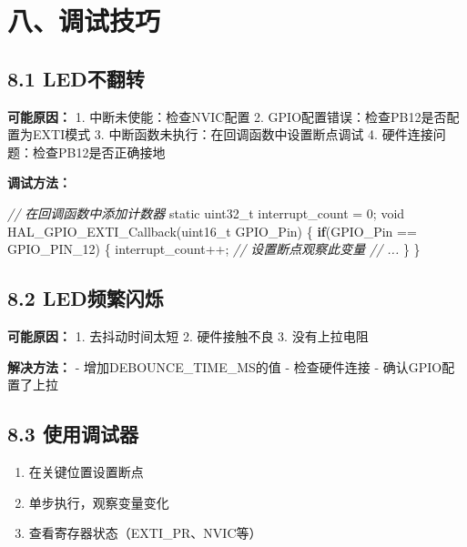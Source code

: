 \documentclass[
  chinese,
  UTF8,
  oneside,
  openany]{ctexbook}
\newenvironment{Shaded}{}{}
\newcommand{\CommentTok}[1]{\textcolor[rgb]{0.38,0.63,0.69}{\textit{#1}}}
\newcommand{\ControlFlowTok}[1]{\textcolor[rgb]{0.00,0.44,0.13}{\textbf{#1}}}
\newcommand{\DataTypeTok}[1]{\textcolor[rgb]{0.56,0.13,0.00}{#1}}
\newcommand{\DecValTok}[1]{\textcolor[rgb]{0.25,0.63,0.44}{#1}}
\newcommand{\NormalTok}[1]{#1}
\newcommand{\OperatorTok}[1]{\textcolor[rgb]{0.40,0.40,0.40}{#1}}
\providecommand{\tightlist}{%
  \setlength{\itemsep}{0pt}\setlength{\parskip}{0pt}}
\begin{document}
\section{八、调试技巧}\label{ux516bux8c03ux8bd5ux6280ux5de7}

\subsection{8.1 LED不翻转}\label{ledux4e0dux7ffbux8f6c}

\textbf{可能原因：} 1. 中断未使能：检查NVIC配置 2.
GPIO配置错误：检查PB12是否配置为EXTI模式 3.
中断函数未执行：在回调函数中设置断点调试 4.
硬件连接问题：检查PB12是否正确接地

\textbf{调试方法：}

\begin{Shaded}
\begin{Highlighting}[]
\CommentTok{// 在回调函数中添加计数器}
\DataTypeTok{static} \DataTypeTok{uint32\_t}\NormalTok{ interrupt\_count }\OperatorTok{=} \DecValTok{0}\OperatorTok{;}
\DataTypeTok{void}\NormalTok{ HAL\_GPIO\_EXTI\_Callback}\OperatorTok{(}\DataTypeTok{uint16\_t}\NormalTok{ GPIO\_Pin}\OperatorTok{)}
\OperatorTok{\{}
  \ControlFlowTok{if}\OperatorTok{(}\NormalTok{GPIO\_Pin }\OperatorTok{==}\NormalTok{ GPIO\_PIN\_12}\OperatorTok{)}
  \OperatorTok{\{}
\NormalTok{    interrupt\_count}\OperatorTok{++;}  \CommentTok{// 设置断点观察此变量}
    \CommentTok{// ...}
  \OperatorTok{\}}
\OperatorTok{\}}
\end{Highlighting}
\end{Shaded}

\subsection{8.2 LED频繁闪烁}\label{ledux9891ux7e41ux95eaux70c1}

\textbf{可能原因：} 1. 去抖动时间太短 2. 硬件接触不良 3. 没有上拉电阻

\textbf{解决方法：} - 增加DEBOUNCE\_TIME\_MS的值 - 检查硬件连接 -
确认GPIO配置了上拉

\subsection{8.3 使用调试器}\label{ux4f7fux7528ux8c03ux8bd5ux5668}

\begin{enumerate}
\def\labelenumi{\arabic{enumi}.}
\tightlist
\item
  在关键位置设置断点
\item
  单步执行，观察变量变化
\item
  查看寄存器状态（EXTI\_PR、NVIC等）
\end{enumerate}
\end{document}
